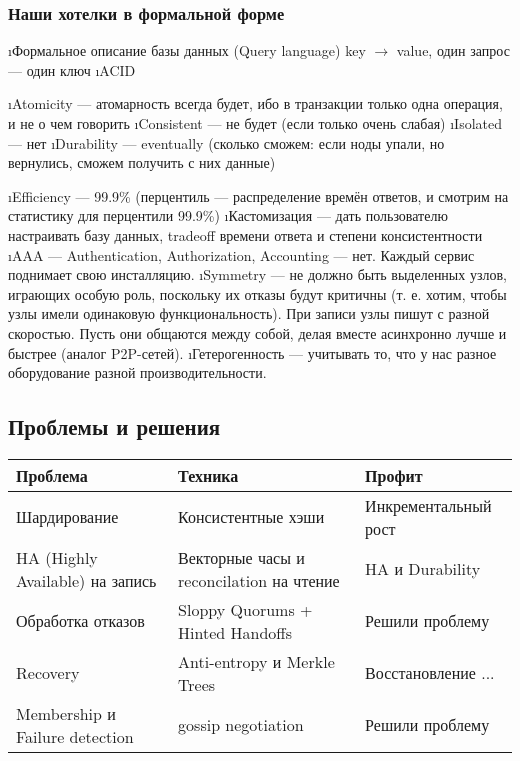 \subsubsection{Наши хотелки в формальной форме}
\begin{enumerate}
\i Формальное описание базы данных (Query language)
key $\to$ value, один запрос --- один ключ
\i ACID 
\begin{enumerate}
\i Atomicity --- атомарность всегда будет, ибо в транзакции только одна операция, и не о чем говорить
\i Consistent --- не будет (если только очень слабая)
\i Isolated --- нет
\i Durability --- eventually (сколько сможем: если ноды упали, но вернулись, сможем получить с них данные)
\end{enumerate}
\i Efficiency --- 99.9\% (перцентиль --- распределение времён ответов, и смотрим на статистику для перцентили 99.9\%)
\i Кастомизация --- дать пользователю настраивать базу данных, tradeoff времени ответа и степени консистентности
\i AAA --- Authentication, Authorization, Accounting --- нет. Каждый сервис поднимает свою инсталляцию.
\i Symmetry --- не должно быть выделенных узлов, играющих особую роль, поскольку их отказы будут критичны (т. е. хотим, чтобы узлы имели одинаковую функциональность).
При записи узлы пишут с разной скоростью. Пусть они общаются между собой, делая вместе асинхронно лучше и быстрее (аналог P2P-сетей).
\i Гетерогенность --- учитывать то, что у нас разное оборудование разной производительности.
\end{enumerate}

\subsection{Проблемы и решения}

\begin{tabular}{|l|l|l|}
\hline
Проблема & Техника & Профит \\ \hline
Шардирование & Консистентные хэши & Инкрементальный рост \\ \hline
HA (Highly Available) на запись & Векторные часы и reconcilation на чтение & HA и Durability\\ \hline
Обработка отказов & Sloppy Quorums + Hinted Handoffs & Решили проблему \\ \hline
Recovery & Anti-entropy и Merkle Trees & Восстановление ... \\ \hline
Membership и Failure detection & gossip negotiation & Решили проблему \\ \hline
\end{tabular}

